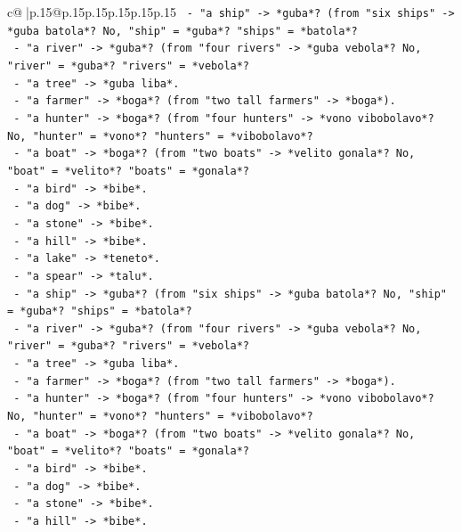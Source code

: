 \documentclass{article}
\begin{document}
{\begin{supertabular}{c@{$\;$}|p{.15\linewidth}@{}p{.15\linewidth}p{.15\linewidth}p{.15\linewidth}p{.15\linewidth}p{.15\linewidth}}
{{{\texttt{      {-} "a ship" {-}> *guba*? (from "six ships" {-}> *guba batola*? No, "ship" = *guba*? "ships" = *batola*?} \\
\texttt{      {-} "a river" {-}> *guba*? (from "four rivers" {-}> *guba vebola*? No, "river" = *guba*? "rivers" = *vebola*?} \\
\texttt{      {-} "a tree" {-}> *guba liba*.} \\
\texttt{      {-} "a farmer" {-}> *boga*? (from "two tall farmers" {-}> *boga*).} \\
\texttt{      {-} "a hunter" {-}> *boga*? (from "four hunters" {-}> *vono vibobolavo*? No, "hunter" = *vono*? "hunters" = *vibobolavo*?} \\
\texttt{      {-} "a boat" {-}> *boga*? (from "two boats" {-}> *velito gonala*? No, "boat" = *velito*? "boats" = *gonala*?} \\
\texttt{      {-} "a bird" {-}> *bibe*.} \\
\texttt{      {-} "a dog" {-}> *bibe*.} \\
\texttt{      {-} "a stone" {-}> *bibe*.} \\
\texttt{      {-} "a hill" {-}> *bibe*.} \\
\texttt{      {-} "a lake" {-}> *teneto*.} \\
\texttt{      {-} "a spear" {-}> *talu*.} \\
\texttt{      {-} "a ship" {-}> *guba*? (from "six ships" {-}> *guba batola*? No, "ship" = *guba*? "ships" = *batola*?} \\
\texttt{      {-} "a river" {-}> *guba*? (from "four rivers" {-}> *guba vebola*? No, "river" = *guba*? "rivers" = *vebola*?} \\
\texttt{      {-} "a tree" {-}> *guba liba*.} \\
\texttt{      {-} "a farmer" {-}> *boga*? (from "two tall farmers" {-}> *boga*).} \\
\texttt{      {-} "a hunter" {-}> *boga*? (from "four hunters" {-}> *vono vibobolavo*? No, "hunter" = *vono*? "hunters" = *vibobolavo*?} \\
\texttt{      {-} "a boat" {-}> *boga*? (from "two boats" {-}> *velito gonala*? No, "boat" = *velito*? "boats" = *gonala*?} \\
\texttt{      {-} "a bird" {-}> *bibe*.} \\
\texttt{      {-} "a dog" {-}> *bibe*.} \\
\texttt{      {-} "a stone" {-}> *bibe*.} \\
\texttt{      {-} "a hill" {-}> *bibe*.} \\
}}}
\end{supertabular}}
\end{document}
